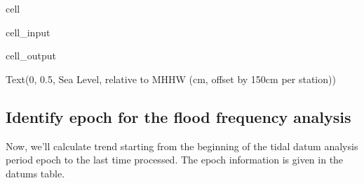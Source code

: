 \documentclass[letterpaper,10pt,english]{jupyterBook}
\begin{document}
\begin{sphinxuseclass}{cell}
\begin{sphinxVerbatimInput}
\begin{sphinxuseclass}{cell_input}
\end{sphinxuseclass}\end{sphinxVerbatimInput}
\begin{sphinxVerbatimOutput}

\begin{sphinxuseclass}{cell_output}
\begin{sphinxVerbatim}[commandchars=\\\{\}]
Text(0, 0.5, \PYGZsq{}Sea Level, relative to MHHW (cm, offset by 150cm per station)\PYGZsq{})
\end{sphinxVerbatim}

\noindent{}

\end{sphinxuseclass}\end{sphinxVerbatimOutput}

\end{sphinxuseclass}

\subsection{Identify epoch for the flood frequency analysis}
\label{\detokenize{notebooks/FloodFrequency:identify-epoch-for-the-flood-frequency-analysis}}
\sphinxAtStartPar
Now, we’ll calculate trend starting from the beginning of the tidal datum analysis period epoch to the last time processed. The  epoch information is given in the datums table.
\end{document}
